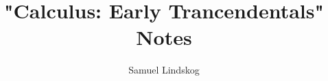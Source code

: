 \documentclass[nobib,notoc]{tufte-handout}
\begin{document}
\theoremstyle{definition}\newtheorem{defi}{Definition}[section]
\theoremstyle{definition}\newtheorem{thm}{Theorem}[section]
\theoremstyle{definition}\newtheorem{cor}{Corollary}[section]
\theoremstyle{definition}\newtheorem{lem}{Lemma}[section]
\theoremstyle{remark}\newtheorem*{notat}{Notation}
\theoremstyle{remark}\newtheorem*{rema}{Remark}
\theoremstyle{definition}\newtheorem{problem}{Problem}
\newenvironment{prob}[1]{\protect\setcounter{problem}{#1}\addtocounter{problem}{-1}\begin{problem}}{\end{problem}}

\title{"Calculus: Early Trancendentals" Notes}
\author{Samuel Lindskog}
\maketitle

\setcounter{section}{1}
\setcounter{tocdepth}{1}
\end{document}
